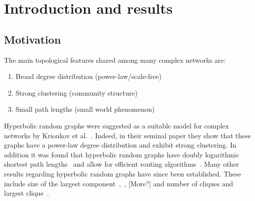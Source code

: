 \section{Introduction and results}

\subsection{Motivation}


The main topological features shared among many complex networks are:
\begin{enumerate}[\upshape 1)]
\item Broad degree distribution (power-law/scale-free)
\item Strong clustering (community structure)
\item Small path lengths (small world phenomenon)
\end{enumerate}

Hyperbolic random graphs were suggested as a suitable model for complex networks by Krioukov et al.~\cite{krioukov2010hyperbolic}. Indeed, in their seminal paper they show that these graphs have a power-law degree distribution and exhibit strong clustering. In addition it was found that hyperbolic random graphs have doubly logarithmic shortest path lengths~\cite{bringmann2016average} and allow for efficient routing algorithms~\cite{bringmann2017greedy}. Many other results regarding hyperbolic random graphs have since been established. These include size of the largest component~\cite{BodeFountoulakisMuller2015},~\cite{fountoulakis2018law}, [More?] and number of cliques and largest clique~\cite{blasius2018cliques}.

